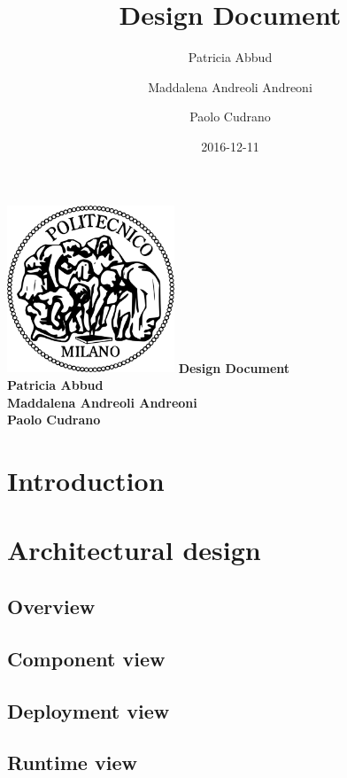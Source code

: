 \documentclass[12pt, a4paper]{article}
\title{Design Document}
\date{2016-12-11}
\author{
	Patricia Abbud
	\and
	Maddalena Andreoli Andreoni
	\and
	Paolo Cudrano
}
\begin{document}
	\begin{titlepage}
		\centering
		\includegraphics[width=5cm]{img/polimi_logo.png} %
		\vfill
		{\bfseries\Large
			Design Document\\
			\vskip4cm
			Patricia Abbud\\
			Maddalena Andreoli Andreoni\\
			Paolo Cudrano\\
		}
		\vfill
		\vfill
	\end{titlepage}

	\tableofcontents
	\newpage

	\section{Introduction}
		

	\newpage
	\section{Architectural design}
		\subsection{Overview}
			

		\subsection{Component view}
			

		\subsection{Deployment view}
			

		\subsection{Runtime view}
			
\end{document}
